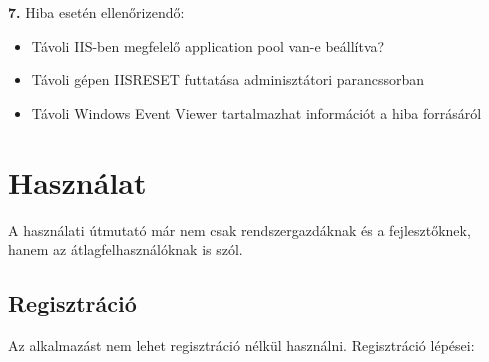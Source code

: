 \documentclass[twoside, a4paper, 12pt]{book}
\begin{document}
\noindent \textbf{7.} Hiba esetén ellenőrizendő:
\begin{itemize}
	\item Távoli IIS-ben megfelelő application pool van-e beállítva?
	\item Távoli gépen IISRESET futtatása adminisztátori parancssorban
	\item Távoli Windows Event Viewer tartalmazhat információt a hiba forrásáról
\end{itemize}

\section{Használat}
A használati útmutató már nem csak rendszergazdáknak és a fejlesztőknek, hanem az átlagfelhasználóknak is szól.
\subsection{Regisztráció}
Az alkalmazást nem lehet regisztráció nélkül használni. Regisztráció lépései:\\
\end{document}
